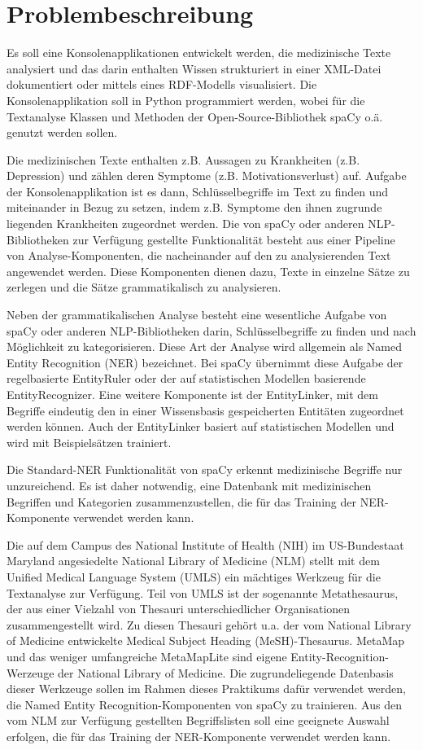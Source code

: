 \chapter{Problembeschreibung}

Es soll eine Konsolenapplikationen entwickelt werden, die medizinische Texte analysiert und das darin enthalten Wissen strukturiert in einer XML-Datei dokumentiert oder mittels eines RDF-Modells visualisiert. Die Konsolenapplikation soll in Python programmiert werden, wobei für die Textanalyse Klassen und Methoden der Open-Source-Bibliothek spaCy o.ä. genutzt werden sollen.

Die medizinischen Texte enthalten z.B. Aussagen zu Krankheiten (z.B. Depression) und zählen deren Symptome (z.B. Motivationsverlust) auf. Aufgabe der Konsolenapplikation ist es dann, Schlüsselbegriffe im Text zu finden und miteinander in Bezug zu setzen, indem z.B. Symptome den ihnen zugrunde liegenden Krankheiten zugeordnet werden. Die von spaCy oder anderen NLP-Bibliotheken zur Verfügung gestellte Funktionalität besteht aus einer Pipeline von Analyse-Komponenten, die nacheinander auf den zu analysierenden Text angewendet werden. Diese Komponenten dienen dazu, Texte in einzelne Sätze zu zerlegen und die Sätze grammatikalisch zu analysieren.

Neben der grammatikalischen Analyse besteht eine wesentliche Aufgabe von spaCy oder anderen NLP-Bibliotheken darin, Schlüsselbegriffe zu finden und nach Möglichkeit zu kategorisieren. Diese Art der Analyse wird allgemein als Named Entity Recognition (NER) bezeichnet. Bei spaCy übernimmt diese Aufgabe der regelbasierte EntityRuler oder der auf statistischen Modellen basierende EntityRecognizer. Eine weitere Komponente ist der EntityLinker, mit dem Begriffe eindeutig den in einer Wissensbasis gespeicherten Entitäten zugeordnet werden können. Auch der EntityLinker basiert auf statistischen Modellen und wird mit Beispielsätzen trainiert.

Die Standard-NER Funktionalität von spaCy erkennt medizinische Begriffe nur unzureichend. Es ist daher notwendig, eine Datenbank mit medizinischen Begriffen und Kategorien zusammenzustellen, die für das Training der NER-Komponente verwendet werden kann.

Die auf dem Campus des National Institute of Health (NIH) im US-Bundestaat Maryland angesiedelte National Library of Medicine (NLM) stellt mit dem Unified Medical Language System (UMLS) ein mächtiges Werkzeug für die Textanalyse zur Verfügung. Teil von UMLS ist der sogenannte Metathesaurus, der aus einer Vielzahl von Thesauri unterschiedlicher Organisationen zusammengestellt wird. Zu diesen Thesauri gehört u.a. der vom National Library of Medicine entwickelte Medical Subject Heading (MeSH)-Thesaurus. MetaMap und das weniger umfangreiche MetaMapLite sind eigene Entity-Recognition-Werzeuge der National Library of Medicine. Die zugrundeliegende Datenbasis dieser Werkzeuge sollen im Rahmen dieses Praktikums dafür verwendet werden, die Named Entity Recognition-Komponenten von spaCy zu trainieren. Aus den vom NLM zur Verfügung gestellten Begriffslisten soll eine geeignete Auswahl erfolgen, die für das Training der NER-Komponente verwendet werden kann.

